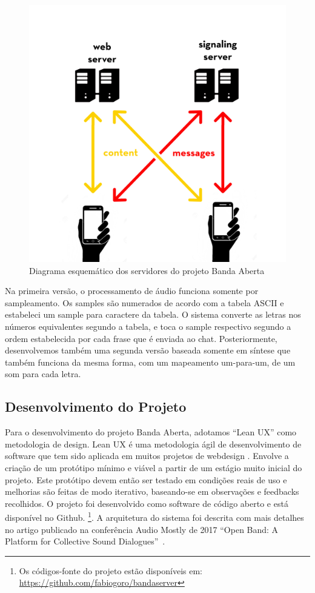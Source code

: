 \begin{figure}[htb]
    \caption{\label{bandaabertaserver}Diagrama esquemático dos servidores do projeto Banda Aberta}
    \begin{center}
        \includegraphics[width=0.5\linewidth]{pictures/server.jpg}
    \end{center}
\end{figure}

Na primeira versão, o processamento de áudio funciona somente por sampleamento. Os samples são numerados de acordo com a tabela ASCII e estabeleci um sample para caractere da tabela. O sistema converte as letras nos números equivalentes segundo a tabela, e toca o sample respectivo segundo a ordem estabelecida por cada frase que é enviada ao chat. Posteriormente, desenvolvemos também uma segunda versão baseada somente em síntese que também funciona da mesma forma, com um mapeamento um-para-um, de um som para cada letra.

\subsection{Desenvolvimento do Projeto}
Para o desenvolvimento do projeto Banda Aberta, adotamos ``Lean UX'' como metodologia de design. Lean UX é uma metodologia ágil de desenvolvimento de software que tem sido aplicada em muitos projetos de webdesign \cite{leanux}. Envolve a criação de um protótipo mínimo e viável a partir de um estágio muito inicial do projeto. Este protótipo devem então ser testado em condições reais de uso e melhorias são feitas de modo iterativo, baseando-se em observações e feedbacks recolhidos. O projeto foi desenvolvido como software de código aberto e está disponível no Github. \footnote{Os códigos-fonte do projeto estão disponíveis em: \url{https://github.com/fabiogoro/bandaserver}}. A arquitetura do sistema foi descrita com mais detalhes no artigo publicado na conferência Audio Mostly de 2017 ``Open Band: A Platform for Collective Sound Dialogues''~\cite{Stolfi2017}.

